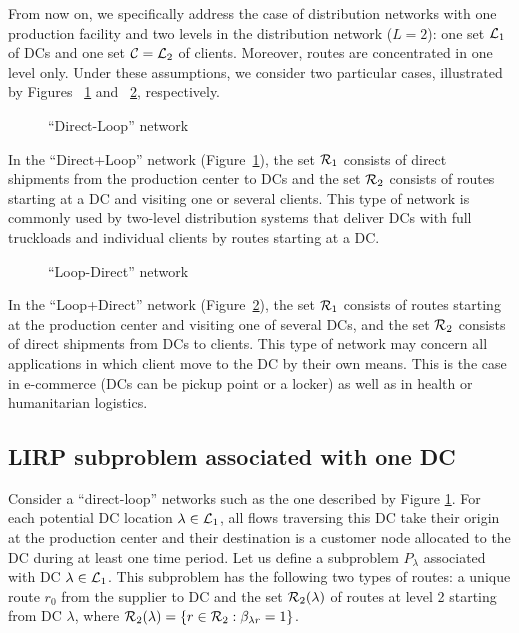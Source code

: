 \documentclass[a4paper,10pt]{article}
\begin{document}
\begin{linenumbers}
From now on, we specifically address the case of distribution networks with one production facility and two levels
in the distribution network ($L=2$): one set $\mathcal{L}_1$ of DCs and one set $\mathcal{C}=\mathcal{L}_2$ of clients. 
Moreover, routes are concentrated in one level only. 
Under these assumptions, we consider two particular cases, illustrated by Figures ~\ref{fig:dl} and ~\ref{fig:ld}, respectively. 

\begin{figure}[htbp]
	\centering
	\caption{ ``Direct-Loop'' network}
	\label{fig:dl}
	
\end{figure}

In the ``Direct+Loop'' network (Figure~\ref{fig:dl}), the set $\mathcal{R}_1$ consists of direct shipments from the production center to DCs  and the set $\mathcal{R}_2$ consists of routes starting at a DC and visiting one or several clients.  This type of network is commonly used by two-level distribution systems that deliver DCs with full truckloads and individual clients by routes starting at a DC.

\begin{figure}[htbp]
	\centering
	\caption{``Loop-Direct'' network}
	\label{fig:ld}
\end{figure}
 
 
In the ``Loop+Direct'' network (Figure~\ref{fig:ld}), the set $\mathcal{R}_1$  consists of routes starting at the production center and visiting one of several DCs, and the set $\mathcal{R}_2$ consists of direct shipments from DCs to clients. This type of network may concern all applications in which client move to the DC by their own means. This is the case in e-commerce (DCs can be pickup point or a locker) as well as in health or humanitarian logistics. 


\subsection{LIRP subproblem associated with one DC}

Consider a ``direct-loop'' networks such as the one described by Figure \ref{fig:dl}. 
For each potential DC location $\lambda\in \mathcal{L}_1$, all flows traversing this DC take their origin at the production center and their destination is a customer node allocated to the DC during at least one time period. 
Let us define a subproblem $P_{\lambda}$ associated with DC $\lambda \in \mathcal{L}_1$. 
This subproblem has the following two types of routes: 
a unique route $r_0$ from the supplier to DC
and the set $\mathcal{R}_2(\lambda)$ of routes at level 2 starting from DC $\lambda$, where 
$\mathcal{R}_2(\lambda)=\left\{r\in\mathcal{R}_2: \beta_{\lambda r}=1\right\}$. 
%


\end{linenumbers}
\end{document}
